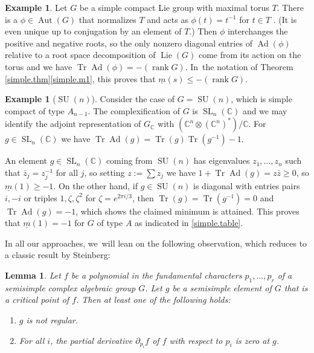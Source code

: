 \documentclass[JEP,XML,SOM,Unicode,NoFloatCountersInSection,published]{cedram}
\newenvironment{enumeratei}
{\bgroup\def\theenumi{\roman{enumi}}\def\theenumii{\arabic{enumii}}\begin{enumerate}}
{\end{enumerate}\egroup}
\newtheorem{lem}[equation]{Lemma}
\theoremstyle{definition}
\newtheorem{example}[equation]{Example}
\newcommand{\C}{\mathbb{C}}
\newcommand{\mmin}{\underline{m}}
\DeclareMathOperator{\SL}{SL}
\DeclareMathOperator{\SU}{SU}
\DeclareMathOperator{\Tr}{Tr}
\DeclareMathOperator{\Ad}{Ad}
\DeclareMathOperator{\Lie}{Lie}
\DeclareMathOperator{\Aut}{Aut}
\DeclareMathOperator{\rank}{rank}
\begin{document}
\begin{example} \label{minus1}
Let $G$ be a simple compact Lie group with maximal torus $T$. There is a $\phi \in \Aut(G)$ that normalizes $T$ and acts as $\phi(t) = t^{-1}$ for $t \in T$ \cite[\S{IX.4.10}, Prop.\,17]{Bou:g7}. (It is even unique up to conjugation by an element of $T$.) Then $\phi$ interchanges the positive and negative roots, so the only nonzero diagonal entries of $\Ad(\phi)$ relative to a root space decomposition of $\Lie(G)$ come from its action on the torus and we have $\Tr \Ad(\phi) = -(\rank G)$. In~the notation of Theorem \ref{simple.thm}\eqref{simple.m1}, this proves that $\mmin(s) \le -(\rank G)$.
\end{example}

\begin{example}[$\SU(n)$] \label{SUn.eg}
Consider the case of $G = \SU(n)$, which is simple compact of type $A_{n-1}$. The complexification of $G$ is $\SL_n(\C)$ and we may identify the adjoint representation of $G_\C$ with $(\C^n \otimes (\C^n)^*)/ \C$. For $g \in \SL_n(\C)$ we have $\Tr \Ad(g) = \Tr(g) \Tr(g^{-1}) - 1$.

An element $g \in \SL_n(\C)$ coming from $\SU(n)$ has eigenvalues $z_1, \ldots, z_n$ such that $\bar{z}_j = z_j^{-1}$ for all $j$, so setting $z := \sum z_j$ we have $1 + \Tr \Ad(g) = z \bar{z} \ge 0$, so $\mmin(1) \ge -1$. On the other hand, if $g \in \SU(n)$ is diagonal with entries pairs $i, -i$ or triples $1, \zeta, \zeta^2$ for $\zeta = e^{2\pi i /3}$, then $\Tr(g) = \Tr(g^{-1}) = 0$ and $\Tr \Ad(g) = -1$, which shows the claimed minimum is attained. This proves that $\mmin(1) = -1$ for $G$ of type $A$ as indicated in \autoref{simple.table}.
\end{example}

In all our approaches, we~will lean on the following observation, which reduces to a classic result by Steinberg:

\begin{lem} \label{St.lem}
Let $f$ be a polynomial in the fundamental characters $p_1, \ldots,p_r$ of a semisimple complex algebraic group $G$.
Let $g$ be a semisimple element of $G$ that is a critical point of $f$. Then at least one of the following holds:
\begin{enumeratei}
\item \label{St.nreg} $g$ is not regular.
\item \label{St.grad} For all $i$, the partial derivative $\partial_{p_i} f$ of $f$ with respect to $p_i$ is zero at $g$.
\end{enumeratei}
\end{lem}
\end{document}
